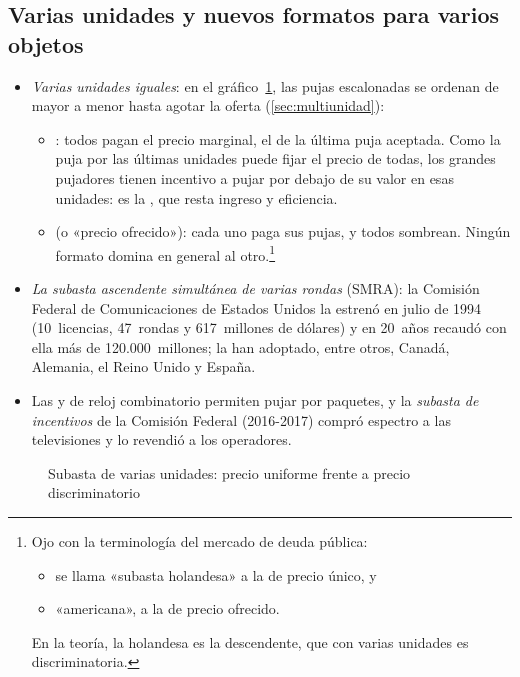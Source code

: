 \documentclass[11pt]{article}
\begin{document}
\subsection*{Varias unidades y nuevos formatos para varios objetos}

\begin{itemize}
\item \emph{Varias unidades iguales}: en el gráfico~\ref{fig:multiunidad}, las pujas escalonadas se ordenan de mayor a menor hasta agotar la oferta (\ref{sec:multiunidad}):
  \begin{itemize}
  \item {}: todos pagan el precio marginal, el de la última puja aceptada. Como la puja por las últimas unidades puede fijar el precio de todas, los grandes pujadores tienen incentivo a pujar por debajo de su valor en esas unidades: es la , que resta ingreso y eficiencia\nocite{AusubelCramtonPyciaRostekWeretka2014Demand}.
  \item {} (o «precio ofrecido»): cada uno paga sus pujas, y todos sombrean. Ningún formato domina en general al otro.\footnote{Ojo con la terminología del mercado de deuda pública:
\begin{itemize}
\item se llama «subasta holandesa» a la de precio único, y
\item «americana», a la de precio ofrecido.
\end{itemize}
En la teoría, la holandesa es la descendente, que con varias unidades es discriminatoria.}
  \end{itemize}
\item \emph{La subasta ascendente simultánea de varias rondas} (SMRA): la Comisión Federal de Comunicaciones de Estados Unidos la estrenó en julio de 1994 (10~licencias, 47~rondas y 617~millones de dólares) y en 20~años recaudó con ella más de 120.000~millones\nocite{Nobel2020Popular}; la han adoptado, entre otros, Canadá, Alemania, el Reino Unido y España\nocite{Nobel2020Scientific}.
\item Las  y de reloj combinatorio permiten pujar por paquetes\nocite{AusubelCramtonMilgrom2006Clock}, y la \emph{subasta de incentivos} de la Comisión Federal (2016-2017) compró espectro a las televisiones y lo revendió a los operadores\nocite{MilgromSegal2020Clock}.
\end{itemize}

\begin{figure}[H]
\centering
\caption{Subasta de varias unidades: precio uniforme frente a precio discriminatorio}\label{fig:multiunidad}
\end{figure}
\end{document}
